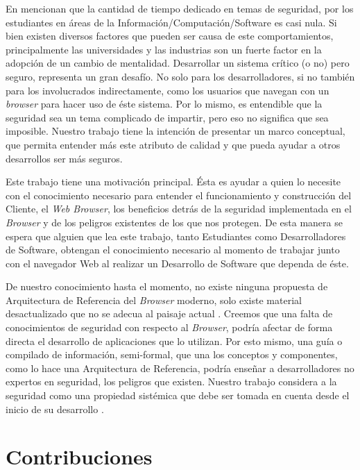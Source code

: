 En \cite{goertzel2007software, WhyteHarrison} mencionan que la cantidad de tiempo dedicado en temas de seguridad, por los estudiantes en áreas de la Información/Computación/Software es casi nula. Si bien existen diversos factores \cite{WhyteHarrison} que pueden ser causa de este comportamientos, principalmente las universidades y las industrias son un fuerte factor en la adopción de un cambio de mentalidad. Desarrollar un sistema crítico (o no) pero seguro, representa un gran desafío. No solo para los desarrolladores, si no también para los involucrados indirectamente, como los usuarios que navegan con un \textit{browser} para hacer uso de éste sistema. Por lo mismo, es entendible que la seguridad sea un tema complicado de impartir, pero eso no significa que sea imposible. Nuestro trabajo tiene la intención de presentar un marco conceptual, que permita entender más este atributo de calidad y que pueda ayudar a otros desarrollos ser más seguros.

Este trabajo tiene una motivación principal. Ésta es ayudar a quien lo necesite con el conocimiento necesario para entender el funcionamiento y construcción del Cliente, el \textit{Web Browser}, los beneficios detrás de la seguridad implementada en el \textit{Browser} y de los peligros existentes de los que nos protegen. De esta manera se espera que alguien que lea este trabajo, tanto Estudiantes como Desarrolladores de Software, obtengan el conocimiento necesario al momento de trabajar junto con el navegador Web al realizar un Desarrollo de Software que dependa de éste.

De nuestro conocimiento hasta el momento, no existe ninguna propuesta de Arquitectura de Referencia del \textit{Browser} moderno, solo existe material desactualizado que no se adecua al paisaje actual \cite{2005-grosskurth-browser-refarch}. Creemos que una falta de conocimientos de seguridad con respecto al \textit{Browser}, podría afectar de forma directa el desarrollo de aplicaciones que lo utilizan. Por esto mismo, una guía o compilado de información, semi-formal, que una los conceptos y componentes, como lo hace una Arquitectura de Referencia, podría enseñar a desarrolladores no expertos en seguridad, los peligros que existen. Nuestro trabajo considera a la seguridad como una propiedad sistémica que debe ser tomada en cuenta desde el inicio de su desarrollo \cite{fernandez2004methodology, fernandez2006defining, braz2008eliciting, fernandez2013security, Fernandez2011}.


\section{Contribuciones}
\label{chap1:contr}

